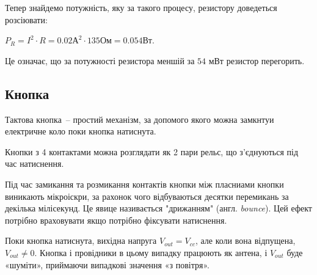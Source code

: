 \documentclass[12pt,a4paper]{report}  %
\begin{document}
Тепер знайдемо потужність, яку за такого процесу, резистору доведеться розсіювати:

$P_R = I^2 \cdot R = 0.02 \text{А}^2 \cdot 135 \text{Ом} = 0.054 \text{Вт}$.

Це означає, що за потужності резистора меншій за $54$ мВт резистор перегорить.


\subsection{Кнопка}
Тактова кнопка~-- простий механізм, за допомого якого можна замкнтуи електричне коло поки кнопка натиснута.

\begin{figure}[h!]
\label{ris:image}
\end{figure}

Кнопки з 4 контактами можна розглядати як 2 пари рельс, що з'єднуються під час натиснення.



Під час замикання та розмикання контактів кнопки між пласниами кнопки виникають мікроіскри, за рахонок чого відбуваються десятки перемикань за декілька мілісекунд. Це явице називається "дрижанням" (англ. \textit{bounce}). Цей ефект потрібно враховувати якщо потрібно фіксувати натиснення.

Поки кнопка натиснута, вихідна напруга $V_{out} = V_{cc}$, але коли вона відпущена, $V_{out} \neq 0$. Кнопка і провідники в цьому випадку працюють як антена, і $V_{out}$ буде «шуміти», приймаючи випадкові значення «з повітря».
\end{document}
